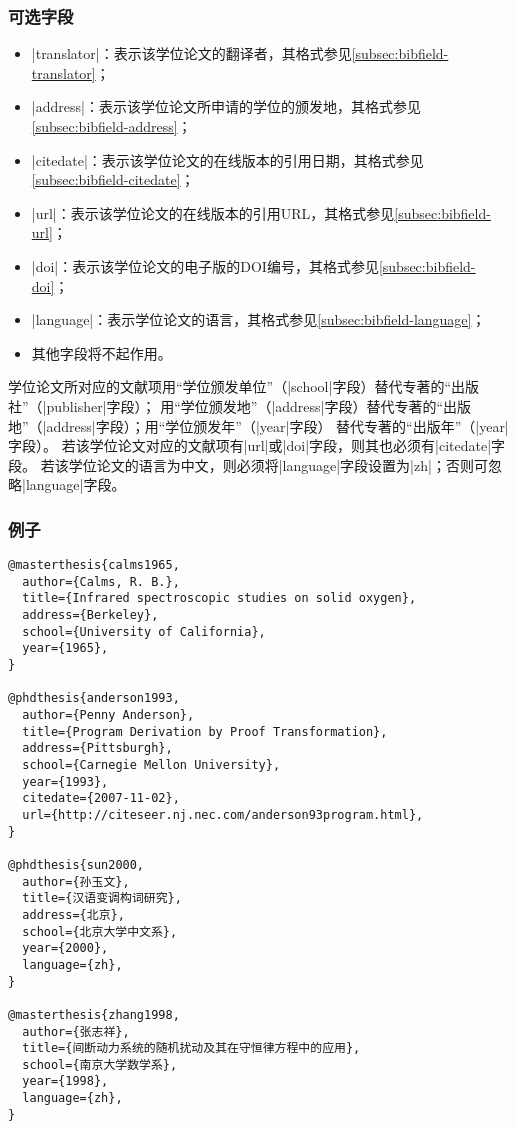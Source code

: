 \subsubsection{可选字段}

\begin{itemize}
\item |translator|：表示该学位论文的翻译者，其格式参见\ref{subsec:bibfield-translator}；
\item |address|：表示该学位论文所申请的学位的颁发地，其格式参见\ref{subsec:bibfield-address}；
\item |citedate|：表示该学位论文的在线版本的引用日期，其格式参见\ref{subsec:bibfield-citedate}；
\item |url|：表示该学位论文的在线版本的引用URL，其格式参见\ref{subsec:bibfield-url}；
\item |doi|：表示该学位论文的电子版的DOI编号，其格式参见\ref{subsec:bibfield-doi}；
\item |language|：表示学位论文的语言，其格式参见\ref{subsec:bibfield-language}；
\item 其他字段将不起作用。
\end{itemize}

\begin{note}
学位论文所对应的文献项用“学位颁发单位”（|school|字段）替代专著的“出版社”（|publisher|字段）；
用“学位颁发地”（|address|字段）替代专著的“出版地”（|address|字段）；用“学位颁发年”（|year|字段）
替代专著的“出版年”（|year|字段）。
若该学位论文对应的文献项有|url|或|doi|字段，则其也必须有|citedate|字段。
若该学位论文的语言为中文，则必须将|language|字段设置为|zh|；否则可忽略|language|字段。
\end{note}

\subsubsection{例子}

\begin{verbatim}
@masterthesis{calms1965,
  author={Calms, R. B.},
  title={Infrared spectroscopic studies on solid oxygen},
  address={Berkeley},
  school={University of California},
  year={1965},
}

@phdthesis{anderson1993,
  author={Penny Anderson},
  title={Program Derivation by Proof Transformation},
  address={Pittsburgh},
  school={Carnegie Mellon University},
  year={1993},
  citedate={2007-11-02},
  url={http://citeseer.nj.nec.com/anderson93program.html},
}

@phdthesis{sun2000,
  author={孙玉文},
  title={汉语变调构词研究},
  address={北京},
  school={北京大学中文系},
  year={2000},
  language={zh},
}

@masterthesis{zhang1998,
  author={张志祥},
  title={间断动力系统的随机扰动及其在守恒律方程中的应用},
  school={南京大学数学系},
  year={1998},
  language={zh},
}
\end{verbatim}

